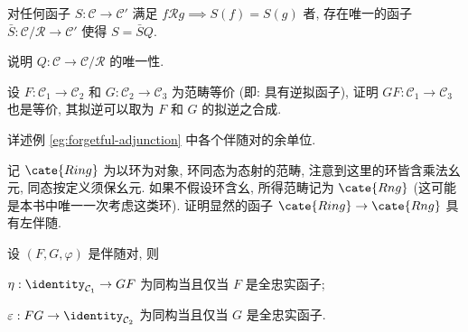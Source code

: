 \begin{Exercises}
\begin{compactitem}
			\item 对任何函子 $S: \mathcal{C} \to \mathcal{C}'$ 满足 $f \mathcal{R} g \implies S(f)=S(g)$ 者, 存在唯一的函子 $\bar{S}: \mathcal{C}/\mathcal{R} \to \mathcal{C}'$ 使得 $S = \bar{S} Q$.
		\end{compactitem}
		说明 $Q: \mathcal{C} \to \mathcal{C}/\mathcal{R}$ 的唯一性.
	\item 设 $F: \mathcal{C}_1 \to \mathcal{C}_2$ 和 $G: \mathcal{C}_2 \to \mathcal{C}_3$ 为范畴等价 (即: 具有逆拟函子), 证明 $GF: \mathcal{C}_1 \to \mathcal{C}_3$ 也是等价, 其拟逆可以取为 $F$ 和 $G$ 的拟逆之合成.
	\item 详述例 \ref{eg:forgetful-adjunction} 中各个伴随对的余单位.
	\item 记 $\cate{Ring}$ 为以环为对象, 环同态为态射的范畴, 注意到这里的环皆含乘法幺元, 同态按定义须保幺元. 如果不假设环含幺, 所得范畴记为 $\cate{Rng}$ (这可能是本书中唯一一次考虑这类环). 证明显然的函子 $\cate{Ring} \to \cate{Rng}$ 具有左伴随.
	\item 设 $(F, G, \varphi)$ 是伴随对, 则
		\begin{inparaenum}[(i)]
			\item $\eta: \identity_{\mathcal{C}_1} \to GF$ 为同构当且仅当 $F$ 是全忠实函子;
			\item $\varepsilon: FG \to \identity_{\mathcal{C}_2}$ 为同构当且仅当 $G$ 是全忠实函子.
		\end{inparaenum}


\end{Exercises}
